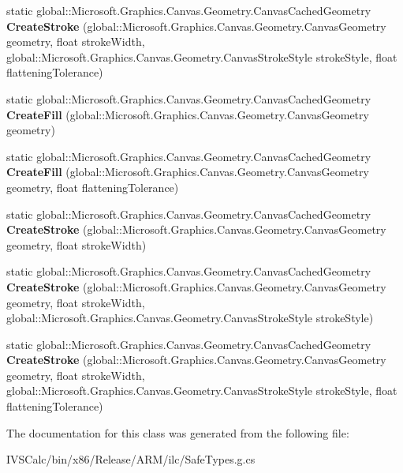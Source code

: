 \begin{DoxyCompactItemize}
static global\+::\+Microsoft.\+Graphics.\+Canvas.\+Geometry.\+Canvas\+Cached\+Geometry {\bfseries Create\+Stroke} (global\+::\+Microsoft.\+Graphics.\+Canvas.\+Geometry.\+Canvas\+Geometry geometry, float stroke\+Width, global\+::\+Microsoft.\+Graphics.\+Canvas.\+Geometry.\+Canvas\+Stroke\+Style stroke\+Style, float flattening\+Tolerance)
\item 
\mbox{\label{class_microsoft_1_1_graphics_1_1_canvas_1_1_geometry_1_1_canvas_cached_geometry_af7e1928aa632df9afaf353ce0742c681}} 
static global\+::\+Microsoft.\+Graphics.\+Canvas.\+Geometry.\+Canvas\+Cached\+Geometry {\bfseries Create\+Fill} (global\+::\+Microsoft.\+Graphics.\+Canvas.\+Geometry.\+Canvas\+Geometry geometry)
\item 
\mbox{\label{class_microsoft_1_1_graphics_1_1_canvas_1_1_geometry_1_1_canvas_cached_geometry_a2c9216474020d5f402b1611e0163c891}} 
static global\+::\+Microsoft.\+Graphics.\+Canvas.\+Geometry.\+Canvas\+Cached\+Geometry {\bfseries Create\+Fill} (global\+::\+Microsoft.\+Graphics.\+Canvas.\+Geometry.\+Canvas\+Geometry geometry, float flattening\+Tolerance)
\item 
\mbox{\label{class_microsoft_1_1_graphics_1_1_canvas_1_1_geometry_1_1_canvas_cached_geometry_a4f114bf6d46b1633a620e968a8a06653}} 
static global\+::\+Microsoft.\+Graphics.\+Canvas.\+Geometry.\+Canvas\+Cached\+Geometry {\bfseries Create\+Stroke} (global\+::\+Microsoft.\+Graphics.\+Canvas.\+Geometry.\+Canvas\+Geometry geometry, float stroke\+Width)
\item 
\mbox{\label{class_microsoft_1_1_graphics_1_1_canvas_1_1_geometry_1_1_canvas_cached_geometry_a633b11623db3794a3d6109c028ed844f}} 
static global\+::\+Microsoft.\+Graphics.\+Canvas.\+Geometry.\+Canvas\+Cached\+Geometry {\bfseries Create\+Stroke} (global\+::\+Microsoft.\+Graphics.\+Canvas.\+Geometry.\+Canvas\+Geometry geometry, float stroke\+Width, global\+::\+Microsoft.\+Graphics.\+Canvas.\+Geometry.\+Canvas\+Stroke\+Style stroke\+Style)
\item 
\mbox{\label{class_microsoft_1_1_graphics_1_1_canvas_1_1_geometry_1_1_canvas_cached_geometry_ae99898b363893b988831d61f23817ef5}} 
static global\+::\+Microsoft.\+Graphics.\+Canvas.\+Geometry.\+Canvas\+Cached\+Geometry {\bfseries Create\+Stroke} (global\+::\+Microsoft.\+Graphics.\+Canvas.\+Geometry.\+Canvas\+Geometry geometry, float stroke\+Width, global\+::\+Microsoft.\+Graphics.\+Canvas.\+Geometry.\+Canvas\+Stroke\+Style stroke\+Style, float flattening\+Tolerance)
\end{DoxyCompactItemize}


The documentation for this class was generated from the following file\+:\begin{DoxyCompactItemize}
\item 
I\+V\+S\+Calc/bin/x86/\+Release/\+A\+R\+M/ilc/Safe\+Types.\+g.\+cs\end{DoxyCompactItemize}
